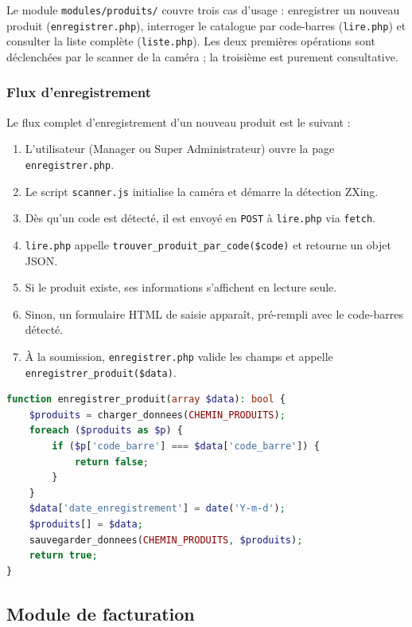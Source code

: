 \documentclass[12pt,a4paper]{article}
\begin{document}
Le module \texttt{modules/produits/} couvre trois cas d'usage : enregistrer un nouveau produit (\texttt{enregistrer.php}), interroger le catalogue par code-barres (\texttt{lire.php}) et consulter la liste complète (\texttt{liste.php}). Les deux premières opérations sont déclenchées par le scanner de la caméra ; la troisième est purement consultative.

\subsubsection{Flux d'enregistrement}

Le flux complet d'enregistrement d'un nouveau produit est le suivant :

\begin{enumerate}[leftmargin=1.5em]
    \item L'utilisateur (Manager ou Super Administrateur) ouvre la page \texttt{enregistrer.php}.
    \item Le script \texttt{scanner.js} initialise la caméra et démarre la détection ZXing.
    \item Dès qu'un code est détecté, il est envoyé en \texttt{POST} à \texttt{lire.php} via \texttt{fetch}.
    \item \texttt{lire.php} appelle \texttt{trouver\_produit\_par\_code(\$code)} et retourne un objet JSON.
    \item Si le produit existe, ses informations s'affichent en lecture seule.
    \item Sinon, un formulaire HTML de saisie apparaît, pré-rempli avec le code-barres détecté.
    \item À la soumission, \texttt{enregistrer.php} valide les champs et appelle \texttt{enregistrer\_produit(\$data)}.
\end{enumerate}

\begin{lstlisting}[language=PHP, caption={Fonction d'enregistrement d'un produit}]
function enregistrer_produit(array $data): bool {
    $produits = charger_donnees(CHEMIN_PRODUITS);
    foreach ($produits as $p) {
        if ($p['code_barre'] === $data['code_barre']) {
            return false;
        }
    }
    $data['date_enregistrement'] = date('Y-m-d');
    $produits[] = $data;
    sauvegarder_donnees(CHEMIN_PRODUITS, $produits);
    return true;
}
\end{lstlisting}

\subsection{Module de facturation}
\end{document}
